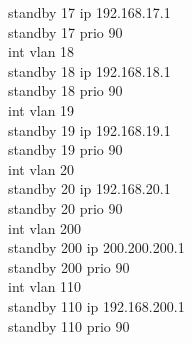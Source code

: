 \documentclass[a4paper, 12pt]{article}
\begin{document}
{\hspace*{2cm}standby 17 ip 192.168.17.1\\
\hspace*{2cm}standby 17 prio 90\\
\hspace*{2cm}int vlan 18\\
\hspace*{2cm}standby 18 ip 192.168.18.1\\
\hspace*{2cm}standby 18 prio 90\\
\hspace*{2cm}int vlan 19\\
\hspace*{2cm}standby 19 ip 192.168.19.1\\
\hspace*{2cm}standby 19 prio 90\\
\hspace*{2cm}int vlan 20\\
\hspace*{2cm}standby 20 ip 192.168.20.1\\
\hspace*{2cm}standby 20 prio 90\\
\hspace*{2cm}int vlan 200\\
\hspace*{2cm}standby 200 ip 200.200.200.1\\
\hspace*{2cm}standby 200 prio 90\\
\hspace*{2cm}int vlan 110\\
\hspace*{2cm}standby 110 ip 192.168.200.1\\
\hspace*{2cm}standby 110 prio 90\\}
\end{document}
